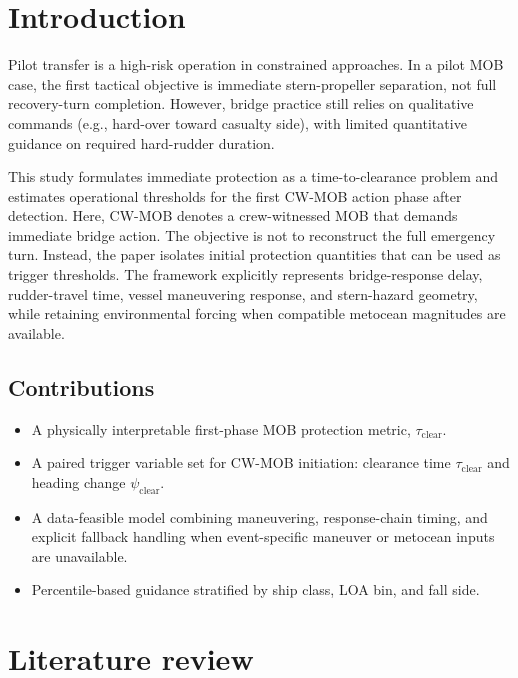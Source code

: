 \documentclass[preprint,12pt]{elsarticle}
\begin{document}
\section{Introduction}
Pilot transfer is a high-risk operation in constrained approaches. In a pilot MOB case, the first tactical objective is immediate stern-propeller separation, not full recovery-turn completion. However, bridge practice still relies on qualitative commands (e.g., hard-over toward casualty side), with limited quantitative guidance on required hard-rudder duration.

This study formulates immediate protection as a time-to-clearance problem and estimates operational thresholds for the first CW-MOB action phase after detection. Here, CW-MOB denotes a crew-witnessed MOB that demands immediate bridge action. The objective is not to reconstruct the full emergency turn. Instead, the paper isolates initial protection quantities that can be used as trigger thresholds. The framework explicitly represents bridge-response delay, rudder-travel time, vessel maneuvering response, and stern-hazard geometry, while retaining environmental forcing when compatible metocean magnitudes are available.

\subsection*{Contributions}
\begin{itemize}
    \item A physically interpretable first-phase MOB protection metric, $\tau_{\mathrm{clear}}$.
    \item A paired trigger variable set for CW-MOB initiation: clearance time $\tau_{\mathrm{clear}}$ and heading change $\psi_{\mathrm{clear}}$.
    \item A data-feasible model combining maneuvering, response-chain timing, and explicit fallback handling when event-specific maneuver or metocean inputs are unavailable.
    \item Percentile-based guidance stratified by ship class, LOA bin, and fall side.
\end{itemize}

\section{Literature review}
\end{document}
